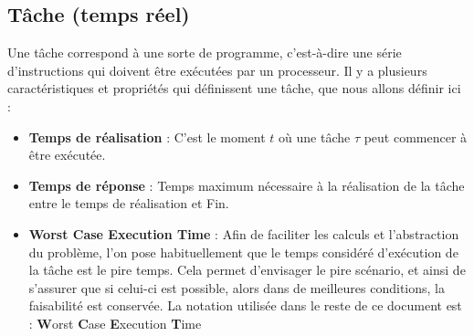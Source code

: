 	\subsection{Tâche (temps réel)}
	Une tâche correspond à une sorte de programme, c'est-à-dire une série d'instructions 
	qui doivent être exécutées par un processeur. 
	Il y a plusieurs caractéristiques 
	et propriétés qui définissent une tâche, que nous allons définir ici : 
	\begin{itemize}
		\item \textbf{Temps de réalisation}\label{tempsderealisation} : C'est le moment $t$ où une tâche $\tau$ peut commencer à être exécutée.
		\item \textbf{Temps de réponse\label{Response Time}} : Temps maximum nécessaire à la réalisation de la tâche 
		entre le temps de réalisation et Fin.
		\item \textbf{Worst Case Execution Time}\label{wcet} : Afin de faciliter les calculs et l'abstraction du problème, 
		l'on pose habituellement que le temps considéré d'exécution de 
		la tâche est le pire temps. Cela permet d'envisager le pire scénario, et ainsi 
		de s'assurer que si celui-ci est possible, alors dans de meilleures conditions, 
		la faisabilité est conservée. La notation utilisée dans le reste de ce document 
		est   : \textbf{W}orst \textbf{C}ase \textbf{E}xecution \textbf{T}ime
		

\end{itemize}
